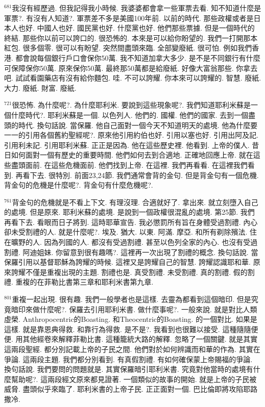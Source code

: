 \documentclass{book}
\begin{document}
$^{681}$我沒有經歷過.
但我記得我小時候.
我婆婆都會拿一些軍票去看.
知不知道什麼是軍票?.
有沒有人知道?.
軍票差不多是美國100年前.
以前的時代.
那些政權或者是日本人也好.
中國人也好.
國民黨也好.
什麼黨也好.
他們那些票據.
但是一個時代的終結.
那些你以前可以誇口的.
很恐怖的.
本來是可以給你盼望的.
我們一打開那本紅包.
很多個零.
很可以有盼望.
突然間盡頭來臨.
全部變廢紙.
很可怕.
例如我們香港.
都會說每個銀行戶口會保你50萬.
我不知道加拿大多少.
是不是不同銀行有什麼可保障保你50萬.
原來保你50萬.
最終那50萬都是給廢紙.
好像大富翁那些.
你拿去吧.
試試看園藥店有沒有給你麵包.
哇.
不可以誇耀.
你本來可以誇耀的.
智慧.
廢紙.
大力.
廢紙.
財富.
廢紙.

$^{721}$很恐怖.
為什麼呢?.
為什麼耶利米.
要說到這些現象呢?.
我們知道耶利米蘇是一個什麼時代?.
耶利米蘇是一個.
以色列人.
他們的.
國權.
他們的國家.
去到一個盡頭的時代.
換句話說.
當保羅.
他自己面對一個今天不知道明天的處境.
他為什麼要一一的引用各個舊約聖經呢?.
原來他引用約伯也好.
引用以塞也好.
引用出阿及記.
引用利未記.
引用耶利米蘇.
正正是因為.
他在這些歷史裡.
他看到.
上帝的僕人.
昔日如何面對一個有歷史的重要時間.
他們如何去到合適地.
正確地回應上帝.
就在這些盡頭面前.
在這些危機面前.
他們找到上帝.
在這裡.
我們再看看.
在這裡我們看到.
再看下去.
很特別.
前面23,24節.
我們通常會背的金句.
但是背金句有一個危機.
背金句的危機是什麼呢?.
背金句有什麼危機呢?.

$^{761}$背金句的危機就是不看上下文.
有理沒理.
合適就好了.
拿出來.
就立刻墮入自己的處境.
但是原來.
耶利米蘇的處境.
是說到一個政權很混亂的處境.
第25節.
我們再看下去.
看眼而日子將到.
這時耶華宣告.
我必懲罰所有旨在身體受過割禮.
內心卻未受割禮的人.
就是什麼呢?.
埃及.
猶大.
以東.
阿滿.
摩亞.
和所有剃除殯法.
住在曠野的人.
因為列國的人.
都沒有受過割禮.
甚至以色列全家的內心.
也沒有受過割禮.
阿迪姐妹.
你留意到很有趣嗎?.
這裡再一次出現了割禮的概念.
換句話說.
當保羅引用以基督耶穌為誇耀的時候.
這裡又是誇耀自己的智慧.
誇耀認識耶和華.
原來誇耀不僅是重複出現的主題.
割禮也是.
真受割禮.
未受割禮.
真的割禮.
假的割禮.
重複的在菲勒比書第三章和耶利米書第九章.

$^{801}$重複一起出現.
很有趣.
我們一般學者也是這樣.
去靈為都看到這個暗印.
但是究竟暗印來做什麼呢?.
保羅去引用耶利米書.
做什麼事呢?.
一般來說.
就是對比人類虛榮.
Anthropocentric的Boasting.
和Theocentric的Boasting.
的一個對比.
如果是這樣.
就是靠恩典得救.
和靠行為得救.
是不是?.
我看到也很難以接受.
這種隨隨便便.
用其他經卷來解釋菲勒比書.
這種籠統大路的解釋.
忽略了一個關鍵.
就是其實這兩段聖經.
都分別記載上帝的子民之間.
他們對於如何辨識而和華的作為.
其實在爭論.
這兩段主題.
我們都分別看到.
有真假割禮.
有如何確保蒙上帝賜福的爭論.
換句話說.
我們要問的問題就是.
其實保羅暗引耶利米書.
究竟對他當時的處境有什麼幫助呢?.
這兩段經文原來都見證著.
一個類似的故事的開始.
就是上帝的子民被威脅.
盡頭似乎來臨了.
耶利米書的上帝子民.
正正面對一個.
巴比倫即將攻陷耶路撒冷.
\end{document}
